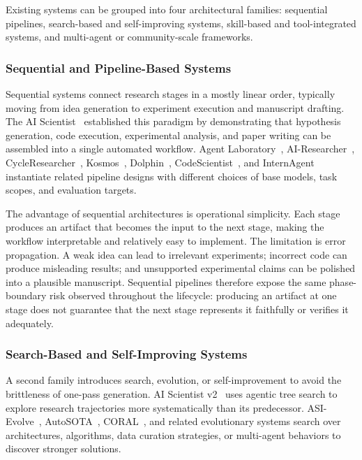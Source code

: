 Existing systems can be grouped into four architectural families: sequential pipelines, search-based and self-improving systems, skill-based and tool-integrated systems, and multi-agent or community-scale frameworks.



\subsubsection{Sequential and Pipeline-Based Systems}

Sequential systems connect research stages in a mostly linear order, typically moving from idea generation to experiment execution and manuscript drafting. The AI Scientist~\cite{lu2024aiscientist} established this paradigm by demonstrating that hypothesis generation, code execution, experimental analysis, and paper writing can be assembled into a single automated workflow. Agent Laboratory~\cite{schmidgall2025agentlab}, AI-Researcher~\cite{airesearcher2025}, CycleResearcher~\cite{cycleresearcher2024}, Kosmos~\cite{kosmos2025}, Dolphin~\cite{dolphin2025}, CodeScientist~\cite{codescientist2025}, and InternAgent~\cite{novelseek2025} instantiate related pipeline designs with different choices of base models, task scopes, and evaluation targets.

The advantage of sequential architectures is operational simplicity. Each stage produces an artifact that becomes the input to the next stage, making the workflow interpretable and relatively easy to implement. The limitation is error propagation. A weak idea can lead to irrelevant experiments; incorrect code can produce misleading results; and unsupported experimental claims can be polished into a plausible manuscript. Sequential pipelines therefore expose the same phase-boundary risk observed throughout the lifecycle: producing an artifact at one stage does not guarantee that the next stage represents it faithfully or verifies it adequately.

\subsubsection{Search-Based and Self-Improving Systems}

A second family introduces search, evolution, or self-improvement to avoid the brittleness of one-pass generation. AI Scientist v2~\cite{yamada2025aiscientistv2} uses agentic tree search to explore research trajectories more systematically than its predecessor. ASI-Evolve~\cite{asievolve2026}, AutoSOTA~\cite{autosota2026}, CORAL~\cite{coral2026}, and related evolutionary systems search over architectures, algorithms, data curation strategies, or multi-agent behaviors to discover stronger solutions.

